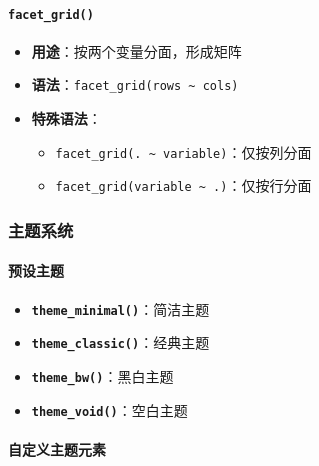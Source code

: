 \documentclass[
]{book}
\providecommand{\tightlist}{%
  \setlength{\itemsep}{0pt}\setlength{\parskip}{0pt}}
\begin{document}
\hypertarget{facet_grid}{%
\paragraph{\texorpdfstring{\texttt{facet\_grid()}}{facet\_grid()}}\label{facet_grid}}

\begin{itemize}
\tightlist
\item
  \textbf{用途}：按两个变量分面，形成矩阵
\item
  \textbf{语法}：\texttt{facet\_grid(rows\ \textasciitilde{}\ cols)}
\item
  \textbf{特殊语法}：

  \begin{itemize}
  \tightlist
  \item
    \texttt{facet\_grid(.\ \textasciitilde{}\ variable)}：仅按列分面
  \item
    \texttt{facet\_grid(variable\ \textasciitilde{}\ .)}：仅按行分面
  \end{itemize}
\end{itemize}

\hypertarget{ux4e3bux9898ux7cfbux7edf}{%
\subsubsection{主题系统}\label{ux4e3bux9898ux7cfbux7edf}}

\hypertarget{ux9884ux8bbeux4e3bux9898}{%
\paragraph{预设主题}\label{ux9884ux8bbeux4e3bux9898}}

\begin{itemize}
\tightlist
\item
  \textbf{\texttt{theme\_minimal()}}：简洁主题
\item
  \textbf{\texttt{theme\_classic()}}：经典主题
\item
  \textbf{\texttt{theme\_bw()}}：黑白主题
\item
  \textbf{\texttt{theme\_void()}}：空白主题
\end{itemize}

\hypertarget{ux81eaux5b9aux4e49ux4e3bux9898ux5143ux7d20}{%
\paragraph{自定义主题元素}\label{ux81eaux5b9aux4e49ux4e3bux9898ux5143ux7d20}}
\end{document}
